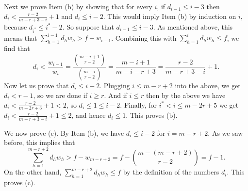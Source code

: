 \documentclass[11pt]{article}
\let\oldendproof\endproof
\renewenvironment{proof}[1][\proofname]{%
	\oldproof[\bf #1]%
}{\oldendproof}
\theoremstyle{plain}
\begin{document}
\begin{proof}[Proof of Lemma \ref{r-graphs induction base case}]
\begin{proof}
        Next we prove Item (b) by showing that for every $i$, if $d_{i-1} \leq i-3$ then $d_i < \frac{r-2}{m-r+3-i} + 1$ and $d_i \leq i-2$. This would imply Item (b) by induction on $i$, because $d_{i^*} \leq i^*-2$. 
        So suppose that $d_{i-1} \leq i-3$. 
        As mentioned above, this means that 
        $\sum_{h=1}^{i-1} d_h w_h > f - w_{i-1}$. Combining this with 
        $\sum_{h=1}^{i} d_h w_h \leq f$, we find that 
        $$
        d_i < \frac{w_{i-1}}{w_i} = 
        \frac{\binom{m-i+1}{r-2}}{\binom{m-i}{r-2}} = \frac{m-i+1}{m-i-r+3} = \frac{r-2}{m-r+3-i} + 1.
        $$ 
        Now let us prove that $d_i \leq i-2$.
        Plugging $i \leq m-r+2$ into the above, we get 
        $d_i < r-1$, so we are done if $i \geq r$. And if $i \leq r$ then by the above we have $d_i < \frac{r-2}{m-2r+3} + 1 < 2$, so $d_i \leq 1 \leq i-2$.
        Finally, for $i^* < i \leq m-2r+5$ we get $d_i < \frac{r-2}{m-r+3-i}+1 \leq 2$, and hence $d_i \leq 1$. This proves (b).
        
        We now prove (c). By Item (b), we have $d_i \leq i-2$ for $i = m-r+2$. As we saw before, this implies that 
        $$
        \sum_{h=1}^{m-r+2} d_h w_h > f-w_{m-r+2} = f - \binom{m-(m-r+2)}{r-2} = f - 1.
        $$
        On the other hand,
        $\sum_{h=1}^{m-r+2} d_h w_h \leq f$ by the definition of the numbers $d_i$. This proves (c).


\end{proof}
\end{proof}
\end{document}
